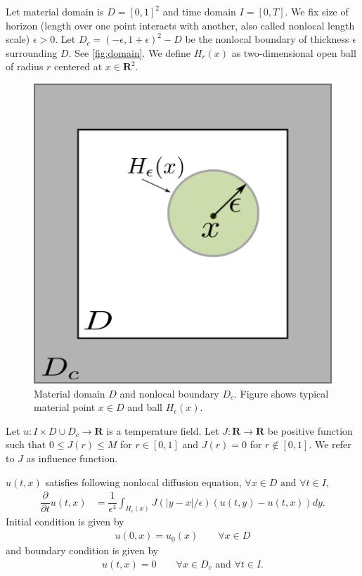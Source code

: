 \documentclass[11pt,twocolumn]{amsart}
\theoremstyle{definition}
\theoremstyle{definition}
\numberwithin{equation}{section}
\numberwithin{equation}{section}
\newcommand{\R}{\mathbf{R}}  %
\begin{document}
Let material domain is $D = [0,1]^2$ and time domain $I = [0,T]$. We fix size of horizon (length over one point interacts with another, also called nonlocal length scale) $\epsilon>0$. Let $D_c = (-\epsilon, 1+\epsilon)^2 - D$ be the nonlocal boundary of thickness $\epsilon$ surrounding $D$. See \autoref{fig:domain}. We define $H_r(x)$ as two-dimensional open ball of radius $r$ centered at $x\in \R^2$.

\begin{figure}
\centering
\includegraphics[scale=0.5]{material_domain.png}
\caption{Material domain $D$ and nonlocal boundary $D_c$. Figure shows typical material point $x\in D$ and ball $H_\epsilon(x)$. }\label{fig:domain}
\end{figure}

Let $u:I \times D\cup D_c \to \R$ is a temperature field. Let $J:\R \to \R$ be positive function such that $0\leq J(r) \leq M$ for $r\in [0,1]$ and $J(r) = 0$ for $r\notin [0,1]$. We refer to $J$ as influence function. 

$u(t,x)$ satisfies following nonlocal diffusion equation, $\forall x\in D \text{ and } \forall t \in I$,
\begin{align}\label{eq:diff eqn}
\dfrac{\partial }{\partial t} u(t,x) &= \dfrac{1}{\epsilon^4} \int_{H_\epsilon(x)} J(|y-x|/\epsilon) (u(t,y) - u(t,x)) dy .
\end{align}
Initial condition is given by
\begin{align}\label{eq:ic}
u(0,x) = u_0(x) \qquad \forall x\in D
\end{align}
and boundary condition is given by
\begin{align} \label{eq:bc}
u(t,x) = 0 \qquad \forall x\in D_c \text{ and } \forall t\in I.
\end{align}
\end{document}
